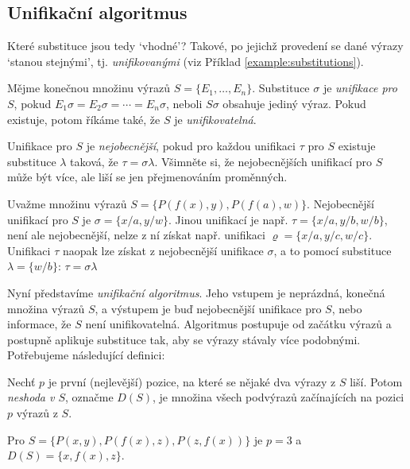 \subsection{Unifikační algoritmus}

Které substituce jsou tedy `vhodné'? Takové, po jejichž provedení se dané výrazy `stanou stejnými', tj. \emph{unifikovanými} (viz Příklad \ref{example:substitutions}).

\begin{definition}[Unifikace]
    Mějme konečnou množinu výrazů $S=\{E_1,\dots,E_n\}$. Substituce $\sigma$ je \emph{unifikace pro $S$}, pokud $E_1\sigma=E_2\sigma=\cdots =E_n\sigma$, neboli $S\sigma$ obsahuje jediný výraz. Pokud existuje, potom říkáme také, že $S$ je \emph{unifikovatelná}.

    Unifikace pro $S$ je \emph{nejobecnější}, pokud pro každou unifikaci $\tau$ pro $S$ existuje substituce $\lambda$ taková, že $\tau=\sigma\lambda$. Všimněte si, že nejobecnějších unifikací pro $S$ může být více, ale liší se jen přejmenováním proměnných.
\end{definition}

\begin{example}
   Uvažme množinu výrazů $S=\{P(f(x),y),P(f(a),w)\}$. Nejobecnější unifikací pro $S$ je $\sigma=\{x/a,y/w\}$. Jinou unifikací je např. $\tau=\{x/a,y/b,w/b\}$, není ale nejobecnější, nelze z ní získat např. unifikaci $\varrho=\{x/a, y/c, w/c\}$. Unifikaci $\tau$ naopak lze získat z nejobecnější unifikace $\sigma$, a to pomocí substituce $\lambda=\{w/b\}$: $\tau=\sigma\lambda$
\end{example}

Nyní představíme \emph{unifikační algoritmus}. Jeho vstupem je neprázdná, konečná množina výrazů $S$, a výstupem je buď nejobecnější unifikace pro $S$, nebo informace, že $S$ není unifikovatelná. Algoritmus postupuje od začátku výrazů a postupně aplikuje substituce tak, aby se výrazy stávaly více podobnými. Potřebujeme následující definici:

Nechť $p$ je první (nejlevější) pozice, na které se nějaké dva výrazy z $S$ liší. Potom \emph{neshoda v $S$}, označme $D(S)$, je množina všech podvýrazů začínajících na pozici $p$ výrazů z $S$.

\begin{example}
Pro $S=\{P(x,y),P(f(x),z),P(z,f(x))\}$ je $p=3$ a $D(S)=\{x,f(x),z\}$.
\end{example}

